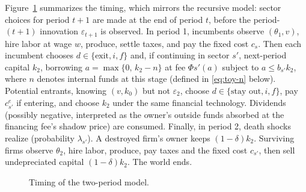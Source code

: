 \documentclass[12pt]{article}
\begin{document}
Figure~\ref{fig:toy-timing} summarizes the timing, which mirrors the recursive model: sector choices for period $t+1$ are made at the end of period $t$, before the period-$(t+1)$ innovation $\varepsilon_{t+1}$ is observed. In period 1, incumbents observe $(\theta_{1},v)$, hire labor at wage $w$, produce, settle taxes, and pay the fixed cost $c_{s}$. Then each incumbent chooses $d\in\{\text{exit},i,f\}$ and, if continuing in sector $s'$, next-period capital $k_{2}$, borrowing $a=\max\{0,\,k_{2}-n\}$ at fee $\Phi{s'}(a)$ subject to $a\leq b_{s'}k_{2}$, where $n$ denotes internal funds at this stage (defined in \eqref{eq:toy-n} below). Potential entrants, knowing $(v,k_{0})$ but not $\varepsilon_{2}$, choose $d\in\{\text{stay out},i,f\}$, pay $c^e_{s'}$ if entering, and choose $k_{2}$ under the same financial technology. Dividends (possibly negative, interpreted as the owner's outside funds absorbed at the financing fee's shadow price) are consumed. Finally, in period 2, death shocks realize (probability $\lambda_{s'}$). A destroyed firm's owner keeps $(1-\delta)k_{2}$. Surviving firms observe $\theta_{2}$, hire labor, produce, pay taxes and the fixed cost $c_{s'}$, then sell undepreciated capital $(1-\delta)k_{2}$. The world ends.

\begin{figure}[H]
\caption{Timing of the two-period model.}
\label{fig:toy-timing}
\centering
{}
\end{figure}
\end{document}
